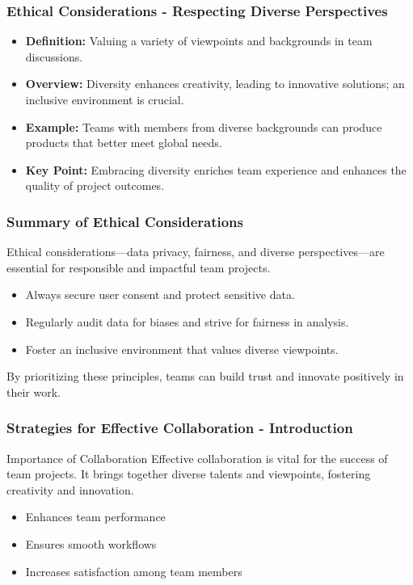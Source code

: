 \documentclass[aspectratio=169]{beamer}
\begin{document}
\begin{frame}[fragile]
    \frametitle{Ethical Considerations - Respecting Diverse Perspectives}
    \begin{itemize}
        \item \textbf{Definition:} Valuing a variety of viewpoints and backgrounds in team discussions.
        \item \textbf{Overview:} Diversity enhances creativity, leading to innovative solutions; an inclusive environment is crucial.
        \item \textbf{Example:} Teams with members from diverse backgrounds can produce products that better meet global needs.
        \item \textbf{Key Point:} Embracing diversity enriches team experience and enhances the quality of project outcomes.
    \end{itemize}
\end{frame}

\begin{frame}[fragile]
    \frametitle{Summary of Ethical Considerations}
    Ethical considerations—data privacy, fairness, and diverse perspectives—are essential for responsible and impactful team projects. 
    \begin{itemize}
        \item Always secure user consent and protect sensitive data.
        \item Regularly audit data for biases and strive for fairness in analysis.
        \item Foster an inclusive environment that values diverse viewpoints.
    \end{itemize}
    By prioritizing these principles, teams can build trust and innovate positively in their work.
\end{frame}

\begin{frame}[fragile]
    \frametitle{Strategies for Effective Collaboration - Introduction}
    \begin{block}{Importance of Collaboration}
        Effective collaboration is vital for the success of team projects. It brings together diverse talents and viewpoints, fostering creativity and innovation.
    \end{block}
    \begin{itemize}
        \item Enhances team performance
        \item Ensures smooth workflows
        \item Increases satisfaction among team members
    \end{itemize}
\end{frame}
\end{document}
